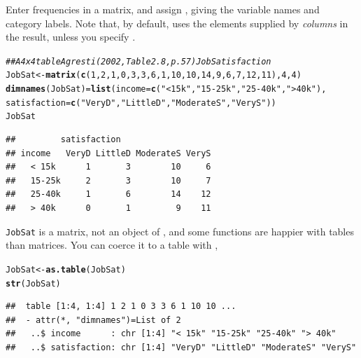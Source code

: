 \documentclass[10pt,twoside]{article}\usepackage[]{graphicx}\usepackage[]{color}
\makeatletter
\newcommand{\hlnum}[1]{\textcolor[rgb]{0.686,0.059,0.569}{#1}}%
\newcommand{\hlstr}[1]{\textcolor[rgb]{0.192,0.494,0.8}{#1}}%
\newcommand{\hlcom}[1]{\textcolor[rgb]{0.678,0.584,0.686}{\textit{#1}}}%
\newcommand{\hlstd}[1]{\textcolor[rgb]{0.345,0.345,0.345}{#1}}%
\newcommand{\hlkwb}[1]{\textcolor[rgb]{0.69,0.353,0.396}{#1}}%
\newcommand{\hlkwc}[1]{\textcolor[rgb]{0.333,0.667,0.333}{#1}}%
\newcommand{\hlkwd}[1]{\textcolor[rgb]{0.737,0.353,0.396}{\textbf{#1}}}%
\newenvironment{kframe}{%
 \def\at@end@of@kframe{}%
 \ifinner\ifhmode%
  \def\at@end@of@kframe{\end{minipage}}%
  \begin{minipage}{\columnwidth}%
 \fi\fi%
 \def\FrameCommand##1{\hskip\@totalleftmargin \hskip-\fboxsep
 \colorbox{shadecolor}{##1}\hskip-\fboxsep
     \hskip-\linewidth \hskip-\@totalleftmargin \hskip\columnwidth}%
 \MakeFramed {\advance\hsize-\width
   \@totalleftmargin\z@ \linewidth\hsize
   \@setminipage}}%
 {\par\unskip\endMakeFramed%
 \at@end@of@kframe}
\newenvironment{knitrout}{}{} %
\newcommand*{\Example}{\fbox{\textbf{\emph{Example}}:} }
\newcommand{\data}[1]{\texttt{#1}}
\newcommand{\codefun}[1]{\code{#1()}}
\makeatother
\begin{document}
\begin{description}
\Example 
Enter frequencies in a matrix, and assign ,
giving the variable names and category labels.  Note that, by default,
\codefun{matrix} uses the elements supplied by \emph{columns} in the
result, unless you specify .
\begin{knitrout}
\color{fgcolor}\begin{kframe}
\begin{alltt}
\hlcom{## A 4 x 4 table  Agresti (2002, Table 2.8, p. 57) Job Satisfaction}
\hlstd{JobSat} \hlkwb{<-} \hlkwd{matrix}\hlstd{(}\hlkwd{c}\hlstd{(}\hlnum{1}\hlstd{,}\hlnum{2}\hlstd{,}\hlnum{1}\hlstd{,}\hlnum{0}\hlstd{,} \hlnum{3}\hlstd{,}\hlnum{3}\hlstd{,}\hlnum{6}\hlstd{,}\hlnum{1}\hlstd{,} \hlnum{10}\hlstd{,}\hlnum{10}\hlstd{,}\hlnum{14}\hlstd{,}\hlnum{9}\hlstd{,} \hlnum{6}\hlstd{,}\hlnum{7}\hlstd{,}\hlnum{12}\hlstd{,}\hlnum{11}\hlstd{),} \hlnum{4}\hlstd{,} \hlnum{4}\hlstd{)}
\hlkwd{dimnames}\hlstd{(JobSat)} \hlkwb{=} \hlkwd{list}\hlstd{(}\hlkwc{income}\hlstd{=}\hlkwd{c}\hlstd{(}\hlstr{"< 15k"}\hlstd{,} \hlstr{"15-25k"}\hlstd{,} \hlstr{"25-40k"}\hlstd{,} \hlstr{"> 40k"}\hlstd{),}
                \hlkwc{satisfaction}\hlstd{=}\hlkwd{c}\hlstd{(}\hlstr{"VeryD"}\hlstd{,} \hlstr{"LittleD"}\hlstd{,} \hlstr{"ModerateS"}\hlstd{,} \hlstr{"VeryS"}\hlstd{))}
\hlstd{JobSat}
\end{alltt}
\begin{verbatim}
##         satisfaction
## income   VeryD LittleD ModerateS VeryS
##   < 15k      1       3        10     6
##   15-25k     2       3        10     7
##   25-40k     1       6        14    12
##   > 40k      0       1         9    11
\end{verbatim}
\end{kframe}
\end{knitrout}

\data{JobSat} is a matrix, not an object of , and some functions
are happier with tables than matrices.
You can coerce it to a table with \codefun{as.table},
\begin{knitrout}
\color{fgcolor}\begin{kframe}
\begin{alltt}
\hlstd{JobSat} \hlkwb{<-} \hlkwd{as.table}\hlstd{(JobSat)}
\hlkwd{str}\hlstd{(JobSat)}
\end{alltt}
\begin{verbatim}
##  table [1:4, 1:4] 1 2 1 0 3 3 6 1 10 10 ...
##  - attr(*, "dimnames")=List of 2
##   ..$ income      : chr [1:4] "< 15k" "15-25k" "25-40k" "> 40k"
##   ..$ satisfaction: chr [1:4] "VeryD" "LittleD" "ModerateS" "VeryS"
\end{verbatim}
\end{kframe}
\end{knitrout}


\end{description}
\end{document}
